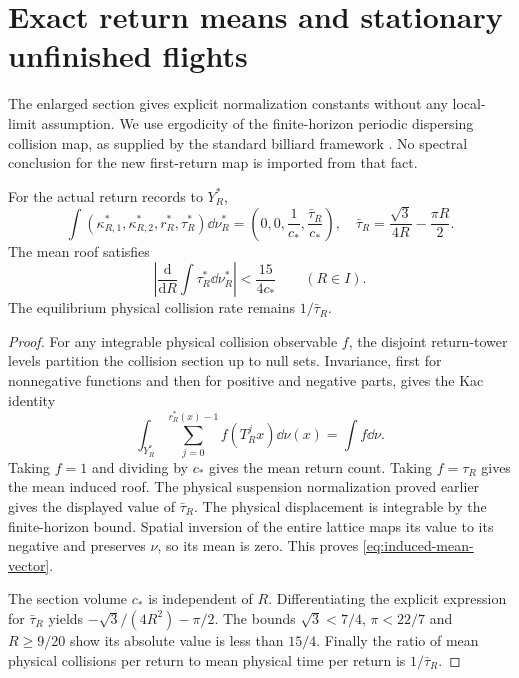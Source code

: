 \section{Exact return means and stationary unfinished flights}
\label{sec:exact-return-means}
The enlarged section gives explicit normalization constants without any
local-limit assumption. We use ergodicity of the finite-horizon
periodic dispersing collision map, as supplied by the standard billiard
framework \cite{Young}. No spectral conclusion for the new first-return
map is imported from that fact.

\begin{proposition}\label{prop:exact-induced-means}
For the actual return records to $Y_R^*$,
\begin{equation}\label{eq:induced-mean-vector}
 \int(\kappa_{R,1}^*,\kappa_{R,2}^*,r_R^*,\tau_R^*)\dd\nu_R^*
 =\left(0,0,\frac1{c_*},\frac{\bar\tau_R}{c_*}\right),
 \quad
 \bar\tau_R=\frac{\sqrt3}{4R}-\frac{\pi R}{2}.
\end{equation}
The mean roof satisfies
\begin{equation}\label{eq:mean-roof-modulus}
 \left|\frac{\mathrm d}{\mathrm dR}\int\tau_R^*\dd\nu_R^*\right|
 <\frac{15}{4c_*}\qquad(R\in I).
\end{equation}
The equilibrium physical collision rate remains $1/\bar\tau_R$.
\end{proposition}
\begin{proof}
For any integrable physical collision observable $f$, the disjoint
return-tower levels partition the collision section up to null sets.
Invariance, first for nonnegative functions and then for positive and
negative parts, gives the Kac identity
\[
 \int_{Y_R^*}\sum_{j=0}^{r_R^*(x)-1} f(T_R^j x)\dd\nu(x)
                         =\int f\dd\nu.
\]
Taking $f=1$ and dividing by $c_*$ gives the mean return count.
Taking $f=\tau_R$ gives the mean induced roof. The physical
suspension normalization proved earlier gives the displayed value
of $\bar\tau_R$. The physical displacement is integrable by the
finite-horizon bound. Spatial inversion of the entire lattice maps
its value to its negative and preserves $\nu$, so its mean is zero.
This proves \eqref{eq:induced-mean-vector}.

The section volume $c_*$ is independent of $R$. Differentiating the
explicit expression for $\bar\tau_R$ yields
$-\sqrt3/(4R^2)-\pi/2$. The bounds $\sqrt3<7/4$,
$\pi<22/7$ and $R\ge9/20$ show its absolute value is less than
$15/4$. Finally the ratio of mean physical collisions per return to
mean physical time per return is $1/\bar\tau_R$.
\end{proof}

